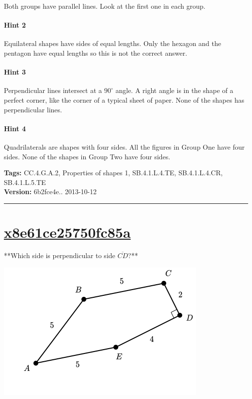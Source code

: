 \documentclass[twocolumn,10pt]{article}
\def\shrinkfactor{0.55}
\begin{document}
Both groups have parallel lines.  Look at the first one in each group.

\paragraph{Hint 2}Equilateral shapes have sides of equal lengths.  Only the hexagon and the pentagon have equal lengths so this is not the correct answer.

\paragraph{Hint 3}Perpendicular lines intersect at a $90 ^\circ$ angle.
A right angle is in the shape of a perfect corner, like the corner of a typical sheet of paper.  None of the shapes has perpendicular lines.

\paragraph{Hint 4}Quadrilaterals are shapes with four sides.  All the figures in Group One have four sides.  None of the shapes in Group Two have four sides.



\medskip
\noindent
\textbf{Tags:} {\footnotesize CC.4.G.A.2, Properties of shapes 1, SB.4.1.L.4.TE, SB.4.1.L.4.CR, SB.4.1.L.5.TE}\\
\textbf{Version:} 6b2fce4e.. 2013-10-12
\smallskip\hrule





\section{\href{https://www.khanacademy.org/devadmin/content/items/x8e61ce25750fc85a}{x8e61ce25750fc85a}}

\noindent
**Which side is perpendicular to side $\overline{CD}$?**


\includegraphics[scale=\shrinkfactor]{figures/e89694af7de05350f951069a187e20d95da00947.png}
\end{document}
